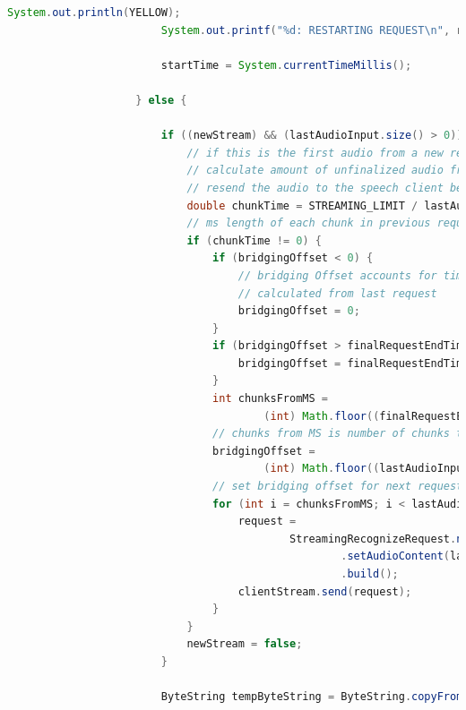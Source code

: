 \documentclass[oneside, 12pt]{book}
\begin{document}
\begin{center}
\begin{lstlisting}[language=java]
                        System.out.println(YELLOW);
                        System.out.printf("%d: RESTARTING REQUEST\n", restartCounter * STREAMING_LIMIT);

                        startTime = System.currentTimeMillis();

                    } else {

                        if ((newStream) && (lastAudioInput.size() > 0)) {
                            // if this is the first audio from a new request
                            // calculate amount of unfinalized audio from last request
                            // resend the audio to the speech client before incoming audio
                            double chunkTime = STREAMING_LIMIT / lastAudioInput.size();
                            // ms length of each chunk in previous request audio arrayList
                            if (chunkTime != 0) {
                                if (bridgingOffset < 0) {
                                    // bridging Offset accounts for time of resent audio
                                    // calculated from last request
                                    bridgingOffset = 0;
                                }
                                if (bridgingOffset > finalRequestEndTime) {
                                    bridgingOffset = finalRequestEndTime;
                                }
                                int chunksFromMS =
                                        (int) Math.floor((finalRequestEndTime - bridgingOffset) / chunkTime);
                                // chunks from MS is number of chunks to resend
                                bridgingOffset =
                                        (int) Math.floor((lastAudioInput.size() - chunksFromMS) * chunkTime);
                                // set bridging offset for next request
                                for (int i = chunksFromMS; i < lastAudioInput.size(); i++) {
                                    request =
                                            StreamingRecognizeRequest.newBuilder()
                                                    .setAudioContent(lastAudioInput.get(i))
                                                    .build();
                                    clientStream.send(request);
                                }
                            }
                            newStream = false;
                        }

                        ByteString tempByteString = ByteString.copyFrom(sharedQueue.take());


\end{lstlisting}
\end{center}
\end{document}
